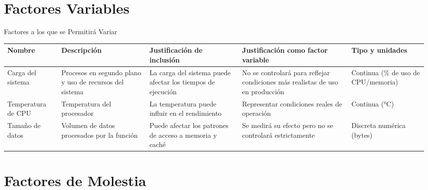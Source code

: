 \documentclass[aspectratio=169]{beamer}
\begin{document}
\section{Factores Variables}

\begin{frame}{Factores a los que se Permitirá Variar}
    \begin{table}
        \begin{tabularx}{\textwidth}{|>{\raggedright\arraybackslash}p{2cm}|>{\raggedright\arraybackslash}X|>{\raggedright\arraybackslash}X|>{\raggedright\arraybackslash}X|>{\raggedright\arraybackslash}p{2.5cm}|}
            \hline
            \textbf{Nombre} & \textbf{Descripción} & \textbf{Justificación de inclusión} & \textbf{Justificación como factor variable} & \textbf{Tipo y unidades} \\
            \hline
            Carga del sistema & Procesos en segundo plano y uso de recursos del sistema & La carga del sistema puede afectar los tiempos de ejecución & No se controlará para reflejar condiciones más realistas de uso en producción & Continua (\% de uso de CPU/memoria) \\
            \hline
            Temperatura de CPU & Temperatura del procesador & La temperatura puede influir en el rendimiento& Representar condiciones reales de operación & Continua (°C) \\
            \hline
            Tamaño de datos & Volumen de datos procesados por la función & Puede afectar los patrones de acceso a memoria y caché & Se medirá su efecto pero no se controlará estrictamente & Discreta numérica (bytes) \\
            \hline
        \end{tabularx}
    \end{table}
\end{frame}

\section{Factores de Molestia}
\end{document}
